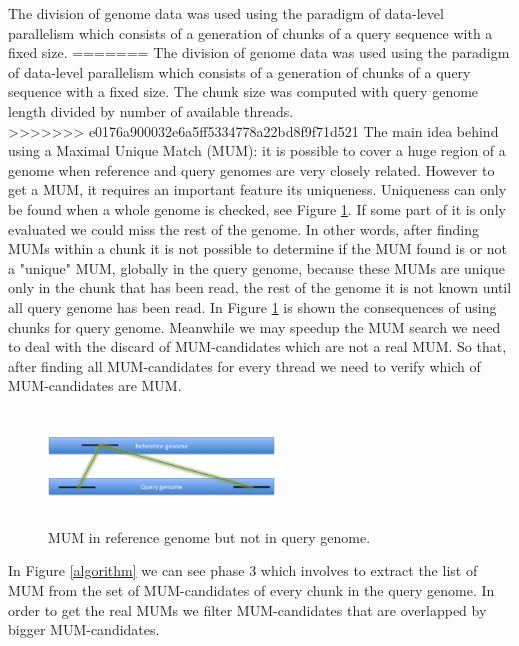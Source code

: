 \documentclass[3p,times]{elsarticle}
\begin{document}
The division of genome data was used using the paradigm of data-level parallelism which consists of a generation of chunks of a query sequence with a fixed size. 
=======
The division of genome data was used using the paradigm of data-level parallelism which consists of a generation of chunks of a query sequence with a fixed size. The chunk size was computed with query genome length divided by number of available threads.\\
>>>>>>> e0176a900032e6a5ff5334778a22bd8f9f71d521
The main idea behind using a Maximal Unique Match (MUM): it is possible to cover a huge region of a genome when reference and query genomes are very closely related. However 
to get a MUM, it requires an important feature its uniqueness. 
Uniqueness can only be found when a whole genome is checked, see Figure \ref{Whole-MUM}. If some part of it is only evaluated we could miss the rest of the genome. In other words, after finding MUMs within a chunk it is not possible to determine if the MUM found is or not a "unique" MUM, globally in the query genome,  because these MUMs are unique only in the chunk that has been read, the rest of the genome it is not known until all query genome has been read. In Figure \ref{Whole-MUM} is shown the consequences of using chunks for query genome. Meanwhile we may speedup the MUM search we need to deal with the discard of MUM-candidates which are not a real MUM. So that, after finding all MUM-candidates for every thread we need to verify which of MUM-candidates are MUM.\\
\begin{figure}[htb]  
\begin{center} 
  \includegraphics[width=6cm,height=3cm]{Whole-MUM.png}
\end{center} 
\caption{MUM in reference genome but not in query genome.} 
\label{Whole-MUM} 
\end{figure}
In Figure \ref{algorithm} we can see phase 3 which involves to extract the list of MUM from the set of MUM-candidates of every chunk in the query genome. In order to get the real MUMs we filter MUM-candidates that are overlapped by bigger MUM-candidates.\\
\end{document}
